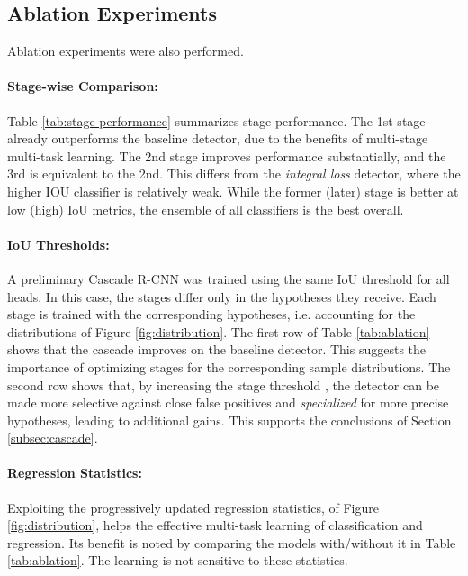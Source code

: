 \documentclass[10pt,twocolumn,letterpaper]{article}
\begin{document}
\subsection{Ablation Experiments}

Ablation experiments were also performed.

\paragraph{Stage-wise Comparison:} Table \ref{tab:stage performance} summarizes
stage performance. The 1st stage already outperforms the baseline detector,
due to the benefits of multi-stage multi-task learning. The 2nd stage improves
performance substantially, and the 3rd is equivalent to the 2nd. This
differs from the \textit{integral loss} detector, where the higher IOU
classifier is relatively weak. While the former (later) stage is better at low (high) IoU metrics, the ensemble of all classifiers is the best overall.

\paragraph{IoU Thresholds:} A preliminary Cascade R-CNN was trained using the same IoU threshold  for all heads. In this case, the stages differ
only in the hypotheses they receive. Each stage is trained with the
corresponding hypotheses, i.e. accounting for the distributions of
Figure \ref{fig:distribution}. The first row of Table \ref{tab:ablation} shows
that the cascade improves on the baseline detector. This suggests the
importance of optimizing stages for the corresponding sample distributions.
The second row shows that, by increasing the stage threshold , the
detector can be made more selective against close false positives and {\it specialized\/} for more precise hypotheses, leading to additional gains. This supports the conclusions of Section \ref{subsec:cascade}.

\paragraph{Regression Statistics:} Exploiting the progressively updated regression statistics, of Figure \ref{fig:distribution}, helps the effective multi-task learning of classification and regression. Its benefit is noted by comparing the models with/without it in Table \ref{tab:ablation}. The learning is not sensitive to these statistics.
\end{document}
